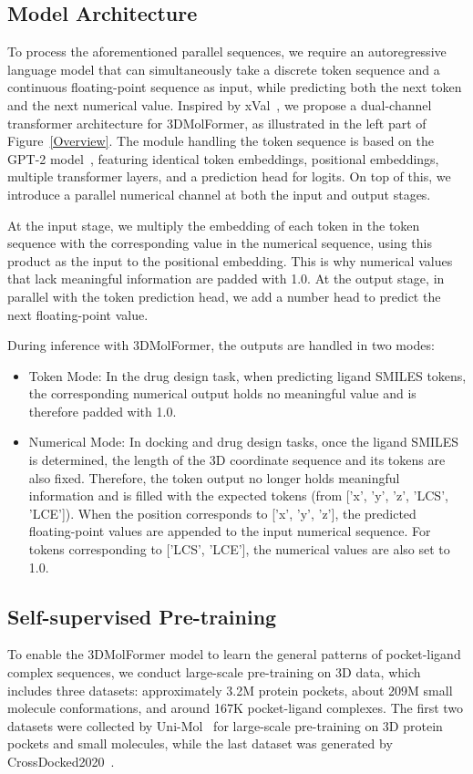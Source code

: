\subsection{Model Architecture}
To process the aforementioned parallel sequences, we require an autoregressive language model that can simultaneously take a discrete token sequence and a continuous floating-point sequence as input, while predicting both the next token and the next numerical value. Inspired by xVal~\citep{xVal}, we propose a dual-channel transformer architecture for 3DMolFormer, as illustrated in the left part of Figure~\ref{Overview}. The module handling the token sequence is based on the GPT-2 model~\citep{GPT-2}, featuring identical token embeddings, positional embeddings, multiple transformer layers, and a prediction head for logits. On top of this, we introduce a parallel numerical channel at both the input and output stages.

At the input stage, we multiply the embedding of each token in the token sequence with the corresponding value in the numerical sequence, using this product as the input to the positional embedding. This is why numerical values that lack meaningful information are padded with 1.0. At the output stage, in parallel with the token prediction head, we add a number head to predict the next floating-point value.

During inference with 3DMolFormer, the outputs are handled in two modes:
\begin{itemize}[leftmargin=*]
    \item Token Mode: In the drug design task, when predicting ligand SMILES tokens, the corresponding numerical output holds no meaningful value and is therefore padded with 1.0.
    \item Numerical Mode: In docking and drug design tasks, once the ligand SMILES is determined, the length of the 3D coordinate sequence and its tokens are also fixed. Therefore, the token output no longer holds meaningful information and is filled with the expected tokens (from ['x', 'y', 'z', 'LCS', 'LCE']). When the position corresponds to ['x', 'y', 'z'], the predicted floating-point values are appended to the input numerical sequence. For tokens corresponding to ['LCS', 'LCE'], the numerical values are also set to 1.0.
\end{itemize}


\subsection{Self-supervised Pre-training}
To enable the 3DMolFormer model to learn the general patterns of pocket-ligand complex sequences, we conduct large-scale pre-training on 3D data, which includes three datasets: approximately 3.2M protein pockets, about 209M small molecule conformations, and around 167K pocket-ligand complexes. The first two datasets were collected by Uni-Mol~\citep{Uni-Mol} for large-scale pre-training on 3D protein pockets and small molecules, while the last dataset was generated by CrossDocked2020~\citep{CrossDocked}.

